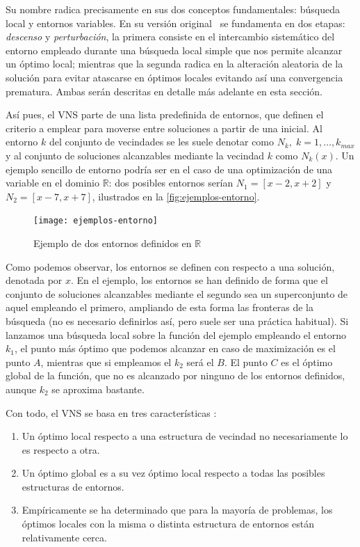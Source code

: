 Su nombre radica precisamente en sus dos conceptos fundamentales: búsqueda local y entornos variables. En su versión original~\cite{vns} se fundamenta en dos etapas: \textit{descenso} y \textit{perturbación}, la primera consiste en el intercambio sistemático del entorno empleado durante una búsqueda local simple que nos permite alcanzar un óptimo local; mientras que la segunda radica en la alteración aleatoria de la solución para evitar atascarse en óptimos locales evitando así una convergencia prematura. Ambas serán descritas en detalle más adelante en esta sección.

Así pues, el VNS parte de una lista predefinida de entornos, que definen el criterio a emplear para moverse entre soluciones a partir de una inicial. Al entorno $k$ del conjunto de vecindades se les suele denotar como $N_k, \; k=1,\dots,k_{max}$ y al conjunto de soluciones alcanzables mediante la vecindad $k$ como $N_k(x)$.
Un ejemplo sencillo de entorno podría ser en el caso de una optimización de una variable en el dominio $\mathbb{R}$: dos posibles entornos serían $N_1=[x-2, x+2]$ y $N_2=[x-7, x+7]$, ilustrados en la \autoref{fig:ejemplos-entorno}.

\begin{figure}[htbp]
    \centering
    \texttt{[image: ejemplos-entorno]}
    \caption{Ejemplo de dos entornos definidos en $\mathbb{R}$}
    \label{fig:ejemplos-entorno}
\end{figure}

Como podemos observar, los entornos se definen con respecto a una solución, denotada por $x$. En el ejemplo, los entornos se han definido de forma que el conjunto de soluciones alcanzables mediante el segundo sea un superconjunto de aquel empleando el primero, ampliando de esta forma las fronteras de la búsqueda (no es necesario definirlos así, pero suele ser una práctica habitual). Si lanzamos una búsqueda local sobre la función del ejemplo empleando el entorno $k_1$, el punto más óptimo que podemos alcanzar en caso de maximización es el punto $A$, mientras que si empleamos el $k_2$ será el $B$. El punto $C$ es el óptimo global de la función, que no es alcanzado por ninguno de los entornos definidos, aunque $k_2$ se aproxima bastante.

Con todo, el VNS se basa en tres características \cite{vns}:

\begin{enumerate}
    \item Un óptimo local respecto a una estructura de vecindad no necesariamente lo es respecto a otra.
    \item Un óptimo global es a su vez óptimo local respecto a todas las posibles estructuras de entornos.
    \item Empíricamente se ha determinado que para la mayoría de problemas, los óptimos locales con la misma o distinta estructura de entornos están relativamente cerca.
\end{enumerate}

